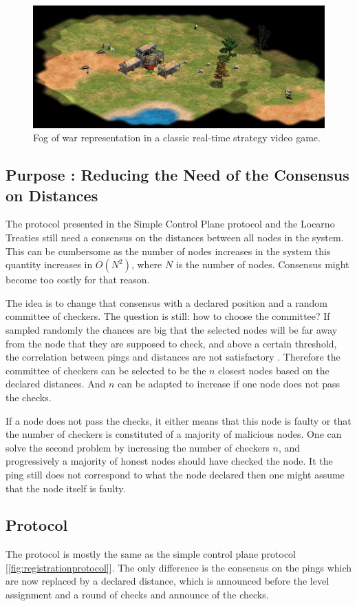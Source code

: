 \documentclass[a4paper,11pt,oneside]{report}
\begin{document}
\begin{figure}[!h] 
\centering
\includegraphics[width=400pt]{figures/fog_of_war}
\caption{Fog of war representation in a classic real-time strategy video game. }
\label{fig:fog-of-the-war}
\end{figure}

\subsection{Purpose : Reducing the Need of the Consensus on Distances}
The protocol presented in the Simple Control Plane protocol and the Locarno
Treaties still need a consensus on the distances between all nodes in the system.
This can be cumbersome as the number of nodes increases in the system this
quantity increases in $O(N^2)$, where $N$ is the number of nodes. Consensus
might become too costly for that reason.

The idea is to change that consensus with a declared position and a random
committee of checkers. The question is still: how to choose the committee? If
sampled randomly the chances are big that the selected nodes will be far away
from the node that they are supposed to check, and above a certain threshold,
the correlation between pings and distances are not satisfactory
\cite{Katz-bassett2006}. Therefore the committee of checkers can be selected to
be the $n$ closest nodes based on the declared distances. And $n$ can be
adapted to increase if one node does not pass the checks. 

If a node does not pass the checks, it either means that this node is faulty or
that the number of checkers is constituted of a majority of malicious nodes.
One can solve the second problem by increasing the number of checkers $n$, and
progressively a majority of honest nodes should have checked the node. It the
ping still does not correspond to what the node declared then one might assume
that the node itself is faulty. 

\subsection{Protocol}
The protocol is mostly the same as the simple control plane protocol
[\autoref{fig:registrationprotocol}]. The only difference is the consensus on
the pings which are now replaced by a declared distance, which is announced
before the level assignment and a round of checks and announce of the checks. 
\end{document}
